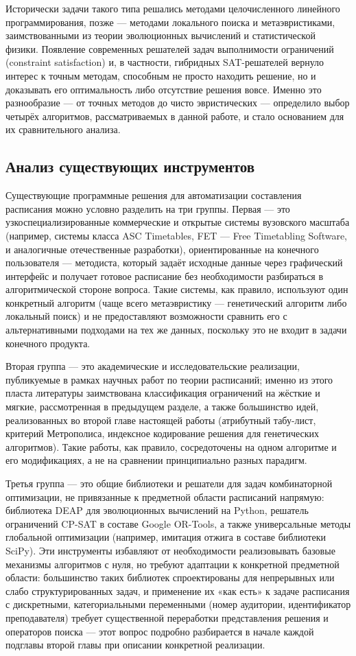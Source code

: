 Исторически задачи такого типа решались методами целочисленного линейного программирования, позже — методами локального поиска и метаэвристиками, заимствованными из теории эволюционных вычислений и статистической физики. Появление современных решателей задач выполнимости ограничений (constraint satisfaction) и, в частности, гибридных SAT-решателей вернуло интерес к точным методам, способным не просто находить решение, но и доказывать его оптимальность либо отсутствие решения вовсе. Именно это разнообразие — от точных методов до чисто эвристических — определило выбор четырёх алгоритмов, рассматриваемых в данной работе, и стало основанием для их сравнительного анализа.


\subsection{Анализ существующих инструментов}

Существующие программные решения для автоматизации составления расписания можно условно разделить на три группы. Первая — это узкоспециализированные коммерческие и открытые системы вузовского масштаба (например, системы класса ASC Timetables, FET — Free Timetabling Software, и аналогичные отечественные разработки), ориентированные на конечного пользователя — методиста, который задаёт исходные данные через графический интерфейс и получает готовое расписание без необходимости разбираться в алгоритмической стороне вопроса. Такие системы, как правило, используют один конкретный алгоритм (чаще всего метаэвристику — генетический алгоритм либо локальный поиск) и не предоставляют возможности сравнить его с альтернативными подходами на тех же данных, поскольку это не входит в задачи конечного продукта.

Вторая группа — это академические и исследовательские реализации, публикуемые в рамках научных работ по теории расписаний; именно из этого пласта литературы заимствована классификация ограничений на жёсткие и мягкие, рассмотренная в предыдущем разделе, а также большинство идей, реализованных во второй главе настоящей работы (атрибутный табу-лист, критерий Метрополиса, индексное кодирование решения для генетических алгоритмов). Такие работы, как правило, сосредоточены на одном алгоритме и его модификациях, а не на сравнении принципиально разных парадигм.

Третья группа — это общие библиотеки и решатели для задач комбинаторной оптимизации, не привязанные к предметной области расписаний напрямую: библиотека DEAP для эволюционных вычислений на Python, решатель ограничений CP-SAT в составе Google OR-Tools, а также универсальные методы глобальной оптимизации (например, имитация отжига в составе библиотеки SciPy). Эти инструменты избавляют от необходимости реализовывать базовые механизмы алгоритмов с нуля, но требуют адаптации к конкретной предметной области: большинство таких библиотек спроектированы для непрерывных или слабо структурированных задач, и применение их «как есть» к задаче расписания с дискретными, категориальными переменными (номер аудитории, идентификатор преподавателя) требует существенной переработки представления решения и операторов поиска — этот вопрос подробно разбирается в начале каждой подглавы второй главы при описании конкретной реализации.

